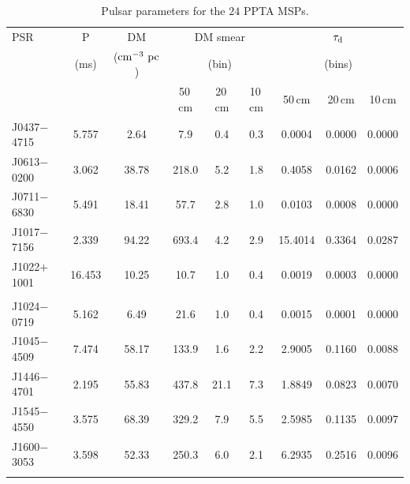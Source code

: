 \documentclass[useAMS,usenatbib]{mn2e}
\begin{document}
\begin{table}
\caption{Pulsar parameters for the $24$ PPTA MSPs.}
\label{psr}
\begin{center}
\begin{tabular}{lcccccccc}
\hline
PSR         &   P     &       DM               &     \multicolumn{3}{c}{DM smear}   &   \multicolumn{3}{c}{$\tau_{\rm{d}}$}       \\
            &  (ms)   &  ($\rm{cm^{-3}\ pc}$)  &     \multicolumn{3}{c}{(bin)}      &   \multicolumn{3}{c}{(bins)}                \\
			      &         &                        &  50\,cm  & 20\,cm  & 10\,cm        & 50\,cm  &     20\,cm      & 10\,cm          \\
\hline
J0437$-$4715&  5.757  &  2.64             & 7.9      & 0.4       & 0.3       &    0.0004  &  0.0000  &  0.0000  \\ 
J0613$-$0200&  3.062  &  38.78            & 218.0    & 5.2       & 1.8       &    0.4058  &  0.0162  &  0.0006  \\ 
J0711$-$6830&  5.491  &  18.41            & 57.7     & 2.8       & 1.0       &    0.0103  &  0.0008  &  0.0000  \\ 
J1017$-$7156&  2.339  &  94.22            & 693.4    & 4.2       & 2.9       &    15.4014  &  0.3364  &  0.0287  \\ 
J1022$+$1001&  16.453 &  10.25            & 10.7     & 1.0       & 0.4       &    0.0019  &  0.0003  &  0.0000  \\ 
            &         &                   &          &           &           &            &          &          \\
J1024$-$0719&  5.162  &  6.49             & 21.6     & 1.0       & 0.4       &    0.0015  &  0.0001  &  0.0000  \\ 
J1045$-$4509&  7.474  &  58.17            & 133.9    & 1.6       & 2.2       &    2.9005  &  0.1160  &  0.0088  \\ 
J1446$-$4701&  2.195  &  55.83            & 437.8    & 21.1      & 7.3       &    1.8849  &  0.0823  &  0.0070  \\ 
J1545$-$4550&  3.575  &  68.39            & 329.2    & 7.9       & 5.5       &    2.5985  &  0.1135  &  0.0097  \\ 
J1600$-$3053&  3.598  &  52.33            & 250.3    & 6.0       & 2.1       &    6.2935  &  0.2516  &  0.0096  \\ 
            &         &                   &          &           &           &            &          &          \\

\end{tabular}
\end{center}
\end{table}
\end{document}
